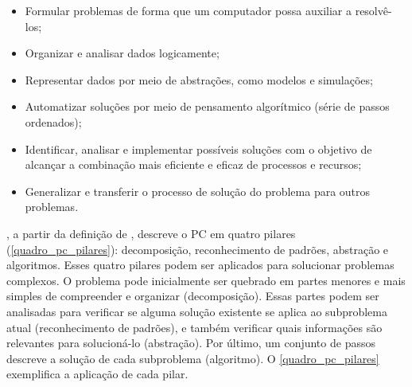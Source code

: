\begin{itemize}
    \item Formular problemas de forma que um computador possa auxiliar a resolvê-los;
    \item Organizar e analisar dados logicamente;
    \item Representar dados por meio de abstrações, como modelos e simulações;
    \item Automatizar soluções por meio de pensamento algorítmico (série de passos ordenados);
    \item Identificar, analisar e implementar possíveis soluções com o objetivo de alcançar a combinação mais eficiente e eficaz de processos e recursos;
    \item Generalizar e transferir o processo de solução do problema para outros problemas.
\end{itemize}

, a partir da definição de , descreve o \ac{PC} em quatro pilares (\autoref{quadro_pc_pilares}): decomposição, reconhecimento de padrões, abstração e algoritmos. Esses quatro pilares podem ser aplicados para solucionar problemas complexos. O problema pode inicialmente ser quebrado em partes menores e mais simples de compreender e organizar (decomposição). Essas partes podem ser analisadas para verificar se alguma solução existente se aplica ao subproblema atual (reconhecimento de padrões), e também verificar quais informações são relevantes para solucioná-lo (abstração). Por último, um conjunto de passos descreve a solução de cada subproblema (algoritmo). O \autoref{quadro_pc_pilares} exemplifica a aplicação de cada pilar.

